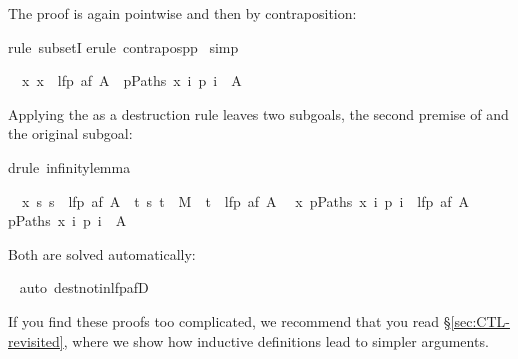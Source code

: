 \begin{isabellebody}
%
\begin{isamarkuptxt}%
\noindent
The proof is again pointwise and then by contraposition:%
\end{isamarkuptxt}%
\isamarkuptrue%
rule\ subsetI{\isacharparenright}\isanewline
\isamarkupfalse%
erule\ contrapos{\isacharunderscore}pp{\isacharparenright}\isanewline
\isamarkupfalse%
\ simp\isamarkupfalse%
%
\begin{isamarkuptxt}%
\begin{isabelle}%
\ {}{\isachardot}\ {\isasymAnd}x{\isachardot}\ x\ {\isasymnotin}\ lfp\ {\isacharparenleft}af\ A{\isacharparenright}\ {\isasymLongrightarrow}\ {\isasymexists}p{\isasymin}Paths\ x{\isachardot}\ {\isasymforall}i{\isachardot}\ p\ i\ {\isasymnotin}\ A%
\end{isabelle}
Applying the  as a destruction rule leaves two subgoals, the second
premise of  and the original subgoal:%
\end{isamarkuptxt}%
\isamarkuptrue%
drule\ infinity{\isacharunderscore}lemma{\isacharparenright}\isamarkupfalse%
%
\begin{isamarkuptxt}%
\begin{isabelle}%
\ {}{\isachardot}\ {\isasymAnd}x{\isachardot}\ {\isasymforall}s{\isachardot}\ s\ {\isasymnotin}\ lfp\ {\isacharparenleft}af\ A{\isacharparenright}\ {\isasymlongrightarrow}\ {\isacharparenleft}{\isasymexists}t{\isachardot}\ {\isacharparenleft}s{\isacharcomma}\ t{\isacharparenright}\ {\isasymin}\ M\ {\isasymand}\ t\ {\isasymnotin}\ lfp\ {\isacharparenleft}af\ A{\isacharparenright}{\isacharparenright}\isanewline
\ {}{\isachardot}\ {\isasymAnd}x{\isachardot}\ {\isasymexists}p{\isasymin}Paths\ x{\isachardot}\ {\isasymforall}i{\isachardot}\ p\ i\ {\isasymnotin}\ lfp\ {\isacharparenleft}af\ A{\isacharparenright}\ {\isasymLongrightarrow}\isanewline
{}p{\isasymin}Paths\ x{\isachardot}\ {\isasymforall}i{\isachardot}\ p\ i\ {\isasymnotin}\ A%
\end{isabelle}
Both are solved automatically:%
\end{isamarkuptxt}%
\ \isamarkuptrue%
auto\ dest{\isacharcolon}not{\isacharunderscore}in{\isacharunderscore}lfp{\isacharunderscore}afD{\isacharparenright}\isanewline
\isamarkupfalse%
\isamarkupfalse%
%
\begin{isamarkuptext}%
If you find these proofs too complicated, we recommend that you read
\S\ref{sec:CTL-revisited}, where we show how inductive definitions lead to
simpler arguments.


\end{isamarkuptext}
\end{isabellebody}
